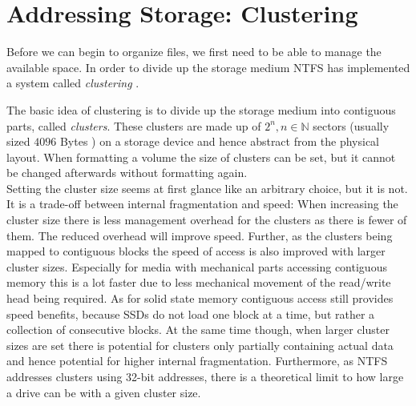 \section{Addressing Storage: Clustering}
\label{sec:Cluster}
Before we can begin to organize files, we first need to be able to manage the available space. In order to divide up the storage medium NTFS has implemented a system called \textit{clustering} \cite{RUSSINOVICH_ET_AL:2012:WI}.

The basic idea of clustering is to divide up the storage medium into contiguous parts, called \textit{clusters}. These clusters are made up of $2^n, n \in \mathbb{N}$\cite{microsoftinc:2018:DCS} sectors (usually sized $4096$ Bytes \cite{bibid}) on a storage device and hence abstract from the physical layout. When formatting a volume the size of clusters can be set, but it cannot be changed afterwards without formatting again\cite{RUSSINOVICH_ET_AL:2012:WI}.\\
Setting the cluster size seems at first glance like an arbitrary choice, but it is not. It is a trade-off between internal fragmentation and speed:
When increasing the cluster size there is less management overhead for the clusters as there is fewer of them. The reduced overhead will improve speed.\cite{RUSSINOVICH_ET_AL:2012:WI} Further, as the clusters being mapped to contiguous blocks the speed of access is also improved with larger cluster sizes. Especially for media with mechanical parts accessing contiguous memory this is a lot faster due to less mechanical movement of the read/write head being required. As for solid state memory contiguous access still provides speed benefits, because SSDs do not load one block at a time, but rather a collection of consecutive blocks.\cite{BELLOSA:2017:OS}
At the same time though, when larger cluster sizes are set there is potential for clusters only partially containing actual data and hence potential for higher internal fragmentation. Furthermore, as NTFS addresses clusters using 32-bit addresses, there is a theoretical limit to how large a drive can be with a given cluster size.\cite{hughes:2010:UT2}

